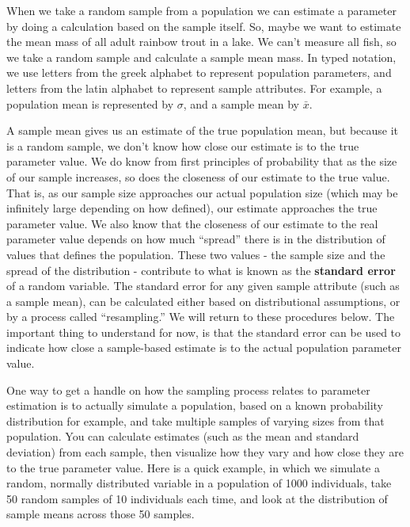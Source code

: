 \documentclass[]{book}
\begin{document}
When we take a random sample from a population we can estimate a parameter by doing a calculation based on the sample itself. So, maybe we want to estimate the mean mass of all adult rainbow trout in a lake. We can't measure all fish, so we take a random sample and calculate a sample mean mass. In typed notation, we use letters from the greek alphabet to represent population parameters, and letters from the latin alphabet to represent sample attributes. For example, a population mean is represented by \(\sigma\), and a sample mean by \(\bar{x}\).

A sample mean gives us an estimate of the true population mean, but because it is a random sample, we don't know how close our estimate is to the true parameter value. We do know from first principles of probability that as the size of our sample increases, so does the closeness of our estimate to the true value. That is, as our sample size approaches our actual population size (which may be infinitely large depending on how defined), our estimate approaches the true parameter value. We also know that the closeness of our estimate to the real parameter value depends on how much ``spread'' there is in the distribution of values that defines the population. These two values - the sample size and the spread of the distribution - contribute to what is known as the \textbf{standard error} of a random variable. The standard error for any given sample attribute (such as a sample mean), can be calculated either based on distributional assumptions, or by a process called ``resampling.'' We will return to these procedures below. The important thing to understand for now, is that the standard error can be used to indicate how close a sample-based estimate is to the actual population parameter value.

One way to get a handle on how the sampling process relates to parameter estimation is to actually simulate a population, based on a known probability distribution for example, and take multiple samples of varying sizes from that population. You can calculate estimates (such as the mean and standard deviation) from each sample, then visualize how they vary and how close they are to the true parameter value. Here is a quick example, in which we simulate a random, normally distributed variable in a population of 1000 individuals, take 50 random samples of 10 individuals each time, and look at the distribution of sample means across those 50 samples.
\end{document}
